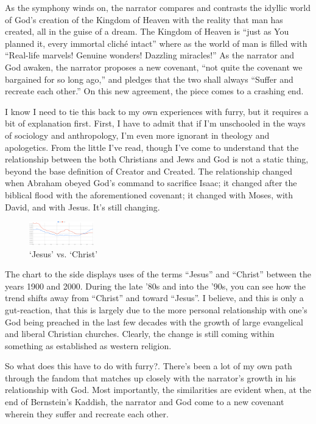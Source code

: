 As the symphony winds on, the narrator compares and contrasts the idyllic world of God's creation of the Kingdom of Heaven with the reality that man has created, all in the guise of a dream.  The Kingdom of Heaven is ``just as You planned it, every immortal cliché intact'' where as the world of man is filled with ``Real-life marvels! Genuine wonders! Dazzling miracles!''  As the narrator and God awaken, the narrator proposes a new covenant, ``not quite the covenant we bargained for so long ago,'' and pledges that the two shall always ``Suffer and recreate each other.''  On this new agreement, the piece comes to a crashing end.

I know I need to tie this back to my own experiences with furry, but it requires a bit of explanation first.  First, I have to admit that if I'm unschooled in the ways of sociology and anthropology, I'm even more ignorant in theology and apologetics.  From the little I've read, though I've come to understand that the relationship between the both Christians and Jews and God is not a static thing, beyond the base definition of Creator and Created.  The relationship changed when Abraham obeyed God's command to sacrifice Isaac; it changed after the biblical flood with the aforementioned covenant; it changed with Moses, with David, and with Jesus.  It's still changing.

\begin{figure}
  \begin{center}
    \includegraphics[width=0.25\textwidth]{content/assets/makyos-kaddish--j-v-c}
  \end{center}
  \caption{`Jesus' vs. `Christ'}
\end{figure}

The chart to the side displays uses of the terms ``Jesus'' and ``Christ'' between the years 1900 and 2000.  During the late '80s and into the '90s, you can see how the trend shifts away from ``Christ'' and toward ``Jesus''.  I believe, and this is only a gut-reaction, that this is largely due to the more personal relationship with one's God being preached in the last few decades with the growth of large evangelical and liberal Christian churches.  Clearly, the change is still coming within something as established as western religion.

So what does this have to do with furry?.  There's been a lot of my own path through the fandom that matches up closely with the narrator's growth in his relationship with God.  Most importantly, the similarities are evident when, at the end of Bernstein's Kaddish, the narrator and God come to a new covenant wherein they suffer and recreate each other.

